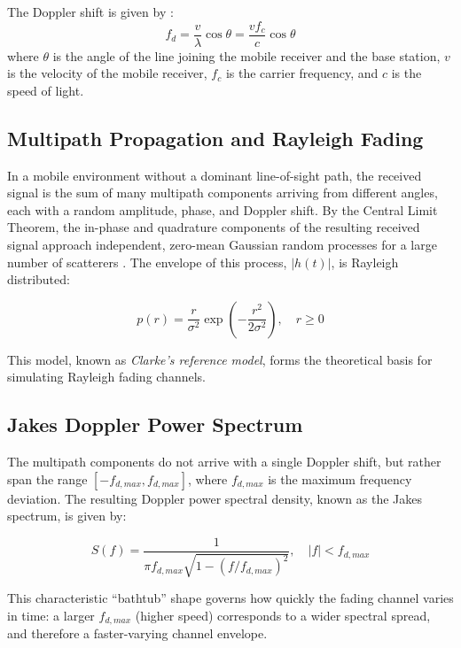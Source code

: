\documentclass[12pt]{article}
\begin{document}
The Doppler shift is given by \cite{rappaport}: 
\begin{equation}
    f_d = \frac{v}{\lambda}\cos\theta = \frac{v f_c}{c}\cos\theta
    \label{eq:doppler}
\end{equation}
where $\theta$ is the angle of the line joining the mobile receiver and the base station, $v$ is the
velocity of the mobile receiver, $f_c$ is the carrier frequency, and $c$ is the speed of light.

\subsection{Multipath Propagation and Rayleigh Fading}

In a mobile environment without a dominant line-of-sight path,
the received signal is the sum of many multipath components
arriving from different angles, each with a random amplitude,
phase, and Doppler shift. By the Central Limit Theorem, the
in-phase and quadrature components of the resulting received
signal approach independent, zero-mean Gaussian random
processes for a large number of scatterers \cite{rappaport}. The
envelope of this process, $|h(t)|$, is Rayleigh distributed:

\begin{equation}
    p(r) = \frac{r}{\sigma^2}\exp\left(-\frac{r^2}{2\sigma^2}\right), \quad r \geq 0
    \label{eq:rayleigh_pdf}
\end{equation}

This model, known as \textit{Clarke's reference model}, forms
the theoretical basis for simulating Rayleigh fading channels.


\subsection{Jakes Doppler Power Spectrum}

The multipath components do not arrive with a single Doppler
shift, but rather span the range $[-f_{d,max}, f_{d,max}]$, where $f_{d,max}$ is the maximum 
frequency deviation. The resulting Doppler power spectral density, known as the Jakes
spectrum, is given by:

\begin{equation}
    S(f) = \frac{1}{\pi f_{d,max}\sqrt{1-(f/f_{d,max})^2}}, \quad |f| < f_{d,max}
    \label{eq:jakes_spectrum}
\end{equation}

This characteristic ``bathtub'' shape governs how quickly the
fading channel varies in time: a larger $f_{d,max}$ (higher
speed) corresponds to a wider spectral spread, and therefore a
faster-varying channel envelope.
\end{document}
